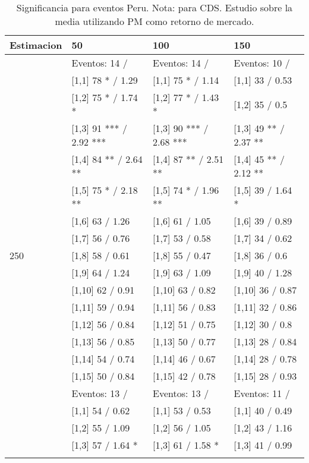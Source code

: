 \begin{table}

\caption{Significancia para eventos Peru. Nota: para CDS. Estudio sobre la media utilizando PM como retorno de mercado.}
\centering
\begin{tabular}[t]{llll}
\toprule
Estimacion & 50 & 100 & 150\\
\midrule
 & Eventos:  14 / & Eventos:  14 / & Eventos:  10 /\\
 & {}[1,1] 78 * / 1.29 & {}[1,1] 75 * / 1.14 & {}[1,1] 33  / 0.53\\
 & {}[1,2] 75 * / 1.74 * & {}[1,2] 77 * / 1.43 * & {}[1,2] 35  / 0.5\\
 & {}[1,3] 91 *** / 2.92 *** & {}[1,3] 90 *** / 2.68 *** & {}[1,3] 49 ** / 2.37 **\\
 & {}[1,4] 84 ** / 2.64 ** & {}[1,4] 87 ** / 2.51 ** & {}[1,4] 45 ** / 2.12 **\\
\addlinespace
 & {}[1,5] 75 * / 2.18 ** & {}[1,5] 74 * / 1.96 ** & {}[1,5] 39  / 1.64 *\\
 & {}[1,6] 63  / 1.26 & {}[1,6] 61  / 1.05 & {}[1,6] 39  / 0.89\\
 & {}[1,7] 56  / 0.76 & {}[1,7] 53  / 0.58 & {}[1,7] 34  / 0.62\\
250 & {}[1,8] 58  / 0.61 & {}[1,8] 55  / 0.47 & {}[1,8] 36  / 0.6\\
 & {}[1,9] 64  / 1.24 & {}[1,9] 63  / 1.09 & {}[1,9] 40  / 1.28\\
\addlinespace
 & {}[1,10] 62  / 0.91 & {}[1,10] 63  / 0.82 & {}[1,10] 36  / 0.87\\
 & {}[1,11] 59  / 0.94 & {}[1,11] 56  / 0.83 & {}[1,11] 32  / 0.86\\
 & {}[1,12] 56  / 0.84 & {}[1,12] 51  / 0.75 & {}[1,12] 30  / 0.8\\
 & {}[1,13] 56  / 0.85 & {}[1,13] 50  / 0.77 & {}[1,13] 28  / 0.84\\
 & {}[1,14] 54  / 0.74 & {}[1,14] 46  / 0.67 & {}[1,14] 28  / 0.78\\
\addlinespace
 & {}[1,15] 50  / 0.84 & {}[1,15] 42  / 0.78 & {}[1,15] 28  / 0.93\\
 & Eventos:  13 / & Eventos:  13 / & Eventos:  11 /\\
 & {}[1,1] 54  / 0.62 & {}[1,1] 53  / 0.53 & {}[1,1] 40  / 0.49\\
 & {}[1,2] 55  / 1.09 & {}[1,2] 56  / 1.05 & {}[1,2] 43  / 1.16\\
 & {}[1,3] 57  / 1.64 * & {}[1,3] 61  / 1.58 * & {}[1,3] 41  / 0.99\\
\addlinespace

\end{tabular}
\end{table}
